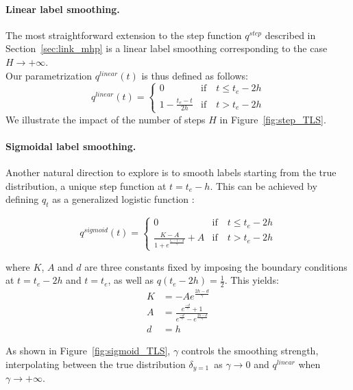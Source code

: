 \documentclass[nohyperref]{article}
\begin{document}
\paragraph{Linear label smoothing.}
The most straightforward extension to the step function $q^{step}$ described in Section~\ref{sec:link_mhp} is a linear label smoothing corresponding to the case $H \rightarrow +\infty$.\\
Our parametrization $q^{linear}( t)$ is thus defined as follows:
\begin{equation}
    q^{linear}( t) = 
    \begin{cases}
    0 & \mathrm{if} \quad t \leq  t_e - 2h \\
    1 - \frac{t_e - t}{2h}& \mathrm{if} \quad t > t_e - 2h    
    \end{cases}
\end{equation}
We illustrate the impact of the number of steps $H$ in Figure~\ref{fig:step_TLS}.

\paragraph{Sigmoidal label smoothing.}
Another natural direction to explore is to smooth labels starting from the true distribution, a unique step function at $t = t_e - h$. This can be achieved by defining $q_t$ as a generalized logistic function \citep{richards1959flexible}:

\begin{equation}
    q^{sigmoid}( t)  = \begin{cases}
    0 & \mathrm{if} \quad t \leq  t_e - 2h \\
    \frac{K-A}{1 + e^{\frac{t_e - t - d}{\gamma}}} + A & \mathrm{if} \quad t > t_e - 2h
    \end{cases}
\end{equation}

where $K$, $A$ and $d$ are three constants fixed by imposing the boundary conditions at $t=t_e - 2h $ and $t=t_e$, as well as $q(t_e - 2h) = \frac{1}{2}$. This yields:
\begin{align*}
K &= -Ae^\frac{2h - d}{\gamma}\\
A &= \frac{e^\frac{- d}{\gamma} + 1 }{e^\frac{- d}{\gamma} - e^\frac{2h - d}{\gamma}}\\
d &= h
\end{align*}

As shown in Figure~\ref{fig:sigmoid_TLS}, $\gamma$ controls the smoothing strength, interpolating between the true distribution $\delta_{y=1}$\ as $\gamma \rightarrow 0$ and $q^{linear}$ when $\gamma \rightarrow +\infty$.
\end{document}
